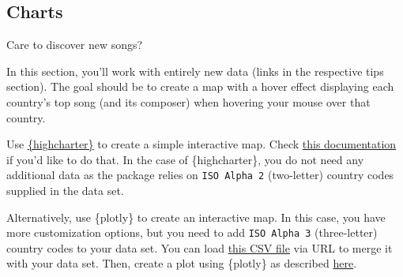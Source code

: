 \documentclass[
  11pt,
]{book}
\newenvironment{tips}[1]
  {
  \begin{itemize}
  \footnotesize
  \renewcommand{\labelitemi}{
    \raisebox{-.7\height}[0pt][0pt]{
      {\setkeys{Gin}{width=3em,keepaspectratio}
        \texttt{[image: images/\#1.png]}}
    }
  }
  \setlength{\fboxsep}{1em}
  \begin{rbox}
  \item
  }
  {
  \end{rbox}
  \end{itemize}
  }
\begin{document}
\hypertarget{charts}{%
\subsection{Charts}\label{charts}}

Care to discover new songs?

In this section, you'll work with entirely new data (links in the respective tips section).
The goal should be to create a map with a hover effect displaying each country's top song (and its composer) when hovering your mouse over that country.

\begin{tips}r

Use \href{https://jkunst.com/highcharter/}{\{highcharter\}} to create a simple interactive map. Check \href{https://jkunst.com/highcharter/articles/maps.html}{this documentation} if you'd like to do that. In the case of \{highcharter\}, you do not need any additional data as the package relies on \texttt{ISO\ Alpha\ 2} (two-letter) country codes supplied in the data set.

Alternatively, use \{plotly\} to create an interactive map. In this case, you have more customization options, but you need to add \texttt{ISO\ Alpha\ 3} (three-letter) country codes to your data set. You can load \href{https://github.com/lukes/ISO-3166-Countries-with-Regional-Codes/blob/master/all/all.csv}{this CSV file} via URL to merge it with your data set. Then, create a plot using \{plotly\} as described \href{https://plotly.com/r/choropleth-maps/}{here}.

\end{tips}
\end{document}
